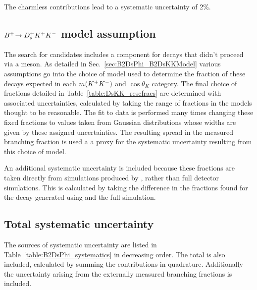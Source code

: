 The charmless contributions lead to a systematic uncertainty of 2\%.

\subsection{${{{B}^+}}\!\rightarrow {\ensuremath{{D}^+_{s}}}{\ensuremath{{K}^+}}{\ensuremath{{K}^-}}$ model assumption}
The search for \decay{\Bp}{\Dsp\phiz} candidates includes a component for \decay{\Bp}{\Dsp\Kp\Km} decays that didn't proceed via a \phiz meson. As detailed in Sec.~\ref{sec:B2DsPhi_B2DsKKModel} various assumptions go into the choice of \decay{\Bp}{\Dsp\Kp\Km} model used to determine the fraction of these decays expected in each $m({{K}^+}{{K}^-})$ and $\cos{\theta_{K}}$ category. The final choice of fractions detailed in Table~\ref{table:DsKK_rescfracs} are determined with associated uncertainties, calculated by taking the range of fractions in the models thought to be reasonable. The fit to data is performed many times changing these fixed fractions to values taken from Gaussian distributions whose widths are given by these assigned uncertainties. The resulting spread in the measured branching fraction is used a a proxy for the systematic uncertainty resulting from this choice of model. 

An additional systematic uncertainty is included because these fractions are taken directly from simulations produced by \laurapp, rather than full detector simulations. This is calculated by taking the difference in the fractions found for the \decay{\Bp}{\Dsp\phiz} decay generated using \laurapp and the full \lhcb simulation.  


\subsection{Total systematic uncertainty}
The sources of systematic uncertainty are listed in Table~\ref{table:B2DsPhi_systematics} in decreasing order. The total is also included, calculated by summing the contributions in quadrature. Additionally the uncertainty arising from the externally measured branching fractions is included. 


